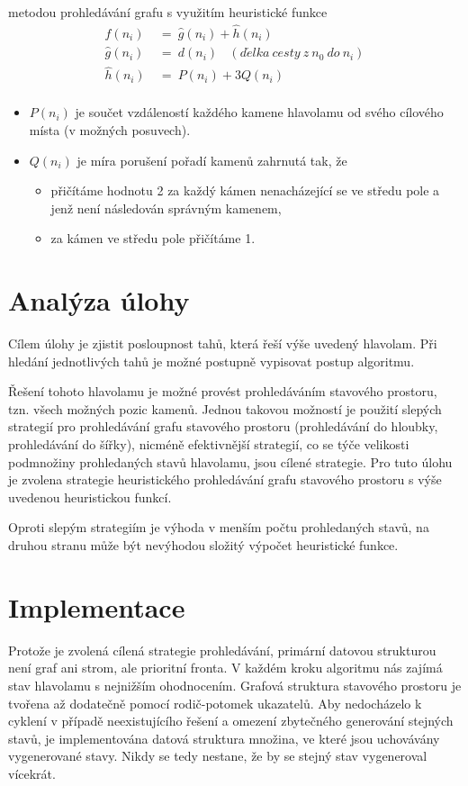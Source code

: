 \documentclass[11pt]{article}
\begin{document}
metodou prohledávání grafu s využitím heuristické funkce
\begin{align*}
\hat{f}(n_i)~&=~\hat{g}(n_i) + \hat{h}(n_i) \\
\hat{g}(n_i)~&=~d(n_i)~~~~(d\acute{e}lka~cesty~z~n_0~do~n_i) \\
\hat{h}(n_i)~&=~P(n_i) + 3 Q(n_i) \\
\end{align*}

\begin{itemize}
	\item $P(n_i)$ je součet vzdáleností každého kamene hlavolamu od svého
          cílového místa (v možných posuvech).
	\item $Q(n_i)$ je míra porušení pořadí kamenů zahrnutá tak, že
	\begin{itemize}
		\item přičítáme hodnotu 2 za každý kámen nenacházející se ve středu
              pole a jenž není následován správným kamenem,
		\item za kámen ve středu pole přičítáme 1.
	\end{itemize}
\end{itemize}


\section{Analýza úlohy}
Cílem úlohy je zjistit posloupnost tahů, která řeší výše uvedený hlavolam.  Při
hledání jednotlivých tahů je možné postupně vypisovat postup algoritmu.

Řešení tohoto hlavolamu je možné provést prohledáváním stavového prostoru, tzn.
všech možných pozic kamenů. Jednou takovou možností je použití slepých
strategií pro prohledávání grafu stavového prostoru (prohledávání do hloubky,
prohledávání do šířky), nicméně efektivnější strategií, co se týče velikosti
podmnožiny prohledaných stavů hlavolamu, jsou cílené strategie. Pro tuto úlohu
je zvolena strategie heuristického prohledávání grafu stavového prostoru s výše
uvedenou heuristickou funkcí.

Oproti slepým strategiím je výhoda v menším počtu prohledaných stavů, na druhou
stranu může být nevýhodou složitý výpočet heuristické funkce.

\section{Implementace}
Protože je zvolená cílená strategie prohledávání, primární datovou strukturou
není graf ani strom, ale prioritní fronta. V každém kroku algoritmu nás zajímá
stav hlavolamu s nejnižším ohodnocením. Grafová struktura stavového prostoru je
tvořena až dodatečně pomocí rodič-potomek ukazatelů. Aby nedocházelo k cyklení
v případě neexistujícího řešení a omezení zbytečného generování stejných stavů,
je implementována datová struktura množina, ve které jsou uchovávány
vygenerované stavy. Nikdy se tedy nestane, že by se stejný stav vygeneroval
vícekrát.
\end{document}
